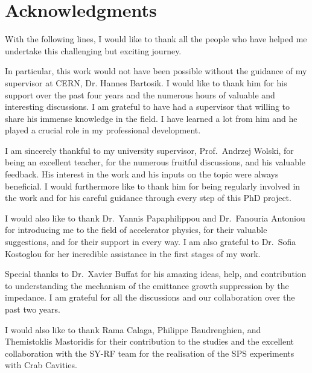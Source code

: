 \cleardoublepage
\chapter*{Acknowledgments}
\thispagestyle{simple} %



With the following lines, I would like to thank all the people who have helped me undertake this challenging but exciting journey.

In particular, this work would not have been possible without the guidance of my supervisor at CERN, Dr. Hannes Bartosik. I would like to thank him for his support over the past four years and the numerous hours of valuable and interesting discussions. I am grateful to have had a supervisor that willing to share his immense knowledge in the field. I have learned a lot from him and he played a crucial role in my professional development. 

I am sincerely thankful to my university supervisor, Prof.~Andrzej Wolski, for being an excellent teacher, for the numerous fruitful discussions, and his valuable feedback. His interest in the work and his inputs on the topic were always beneficial. I would furthermore like to thank him for being regularly involved in the work and for his careful guidance through every step of this PhD project. 

I would also like to thank Dr.~Yannis Papaphilippou and Dr.~Fanouria Antoniou for introducing me to the field of accelerator physics, for their valuable suggestions, and for their support in every way. I am also grateful to Dr.~Sofia Kostoglou for her incredible assistance in the first stages of my work.

Special thanks to Dr.~Xavier Buffat for his amazing ideas, help, and contribution to understanding the mechanism of the emittance growth suppression by the impedance. I am grateful for all the discussions and our collaboration over the past two years. 

I would also like to thank Rama Calaga, Philippe Baudrenghien, and Themistoklis Mastoridis for their contribution to the studies and the excellent collaboration with the SY-RF team for the realisation of the SPS experiments with Crab Cavities.

